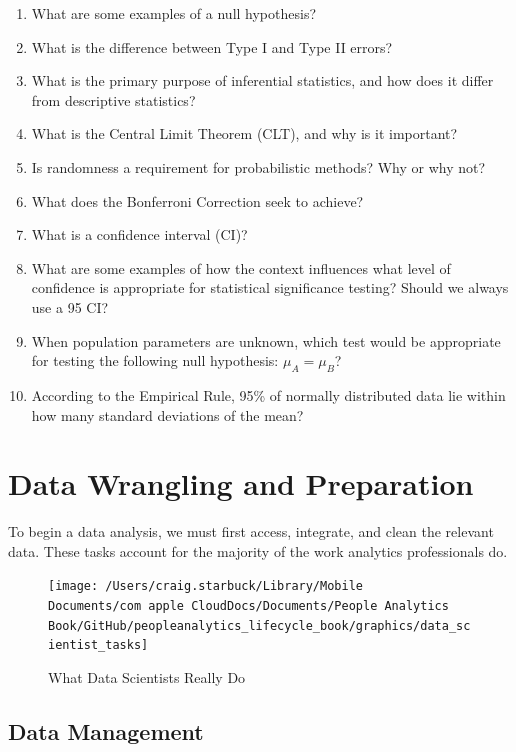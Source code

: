 \documentclass[]{book}
\begin{document}
\begin{enumerate}
\def\labelenumi{\arabic{enumi}.}
\item
  What are some examples of a null hypothesis?
\item
  What is the difference between Type I and Type II errors?
\item
  What is the primary purpose of inferential statistics, and how does it differ from descriptive statistics?
\item
  What is the Central Limit Theorem (CLT), and why is it important?
\item
  Is randomness a requirement for probabilistic methods? Why or why not?
\item
  What does the Bonferroni Correction seek to achieve?
\item
  What is a confidence interval (CI)?
\item
  What are some examples of how the context influences what level of confidence is appropriate for statistical significance testing? Should we always use a 95 CI?
\item
  When population parameters are unknown, which test would be appropriate for testing the following null hypothesis: \(\mu_A = \mu_B\)?
\item
  According to the Empirical Rule, 95\% of normally distributed data lie within how many standard deviations of the mean?
\end{enumerate}

\hypertarget{data-wrang-prep}{%
\chapter{Data Wrangling and Preparation}\label{data-wrang-prep}}

To begin a data analysis, we must first access, integrate, and clean the relevant data. These tasks account for the majority of the work analytics professionals do.

\begin{figure}

{\centering \texttt{[image: /Users/craig.starbuck/Library/Mobile Documents/com~apple~CloudDocs/Documents/People Analytics Book/GitHub/peopleanalytics\_lifecycle\_book/graphics/data\_scientist\_tasks]} 

}

\caption{What Data Scientists Really Do}\label{fig:ds-tasks}
\end{figure}

\hypertarget{data-management}{%
\section{Data Management}\label{data-management}}
\end{document}
